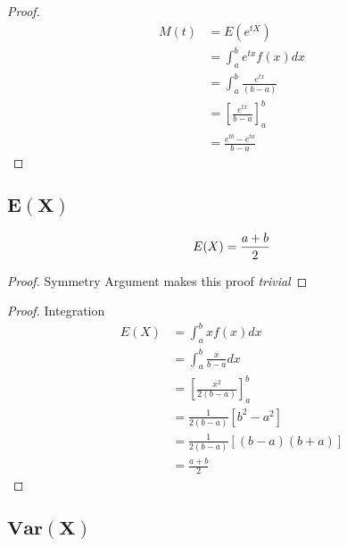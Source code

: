 \documentclass[12pt]{article}
\begin{document}
\begin{proof}
\begin{align*}
  M(t) &= E(e^{tX})\\
       &= \int_{a}^{b} e^{tx} f(x) dx \\
       &= \int_{a}^{b} \frac{e^{tx}}{(b-a)} \\
       &= \left[\frac{e^{tx}}{b-a} \right]_{a}^{b} \\
       &= \frac{e^{tb}-e^{ta}}{b-a}
\end{align*}
\end{proof}

\subsection{$\bm{E(X)}$}

\begin{equation*}
  E(X) = \frac{a+b}{2} \\
\end{equation*}

\begin{proof}
  Symmetry Argument makes this proof \emph{trivial}
\end{proof}

\begin{proof} Integration
  \begin{align*}
    E(X) &= \int_{a}^{b} x f(x) dx \\
         &= \int_{a}^{b} \frac{x}{b-a} dx \\
         &= \left[\frac{x^{2}}{2(b-a)}\right]_{a}^{b} \\
         &= \frac{1}{2(b-a)}[b^{2}-a^{2}] \\
         &= \frac{1}{2(b-a)}[(b-a)(b+a)] \\
         &= \frac{a+b}{2}
  \end{align*}
\end{proof}

\subsection{$\bm{Var(X)}$}
\end{document}
